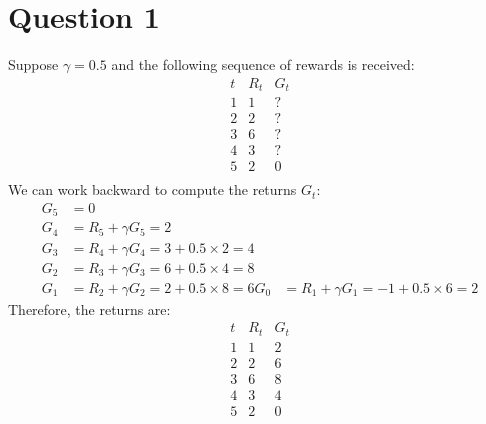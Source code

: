 \section{Question 1}
Suppose $\gamma = 0.5$ and the following sequence of rewards is received:
$$
\begin{array}{c|c|c}
    t & R_t & G_t \\ \hline
    1 & 1 & ? \\
    2 & 2 & ? \\
    3 & 6 & ? \\
    4 & 3 & ? \\
    5 & 2 & 0 \\
    \end{array}
$$
We can work backward to compute the returns $G_t$:
\begin{align*}
    G_5 &= 0\\
    G_4 &= R_5 + \gamma G_5 = 2\\
    G_3 &= R_4 + \gamma G_4 = 3 + 0.5 \times 2 = 4\\
    G_2 &= R_3 + \gamma G_3 = 6 + 0.5 \times 4 = 8\\
    G_1 &= R_2 + \gamma G_2 = 2 + 0.5 \times 8 = 6
    G_0 &= R_1 + \gamma G_1 = -1 + 0.5 \times 6 = 2
\end{align*}
Therefore, the returns are:
\[
\begin{array}{c|c|c}
    t & R_t & G_t \\ \hline
    1 & 1 & 2 \\
    2 & 2 & 6 \\
    3 & 6 & 8 \\
    4 & 3 & 4 \\
    5 & 2 & 0 \\
    \end{array}
\]